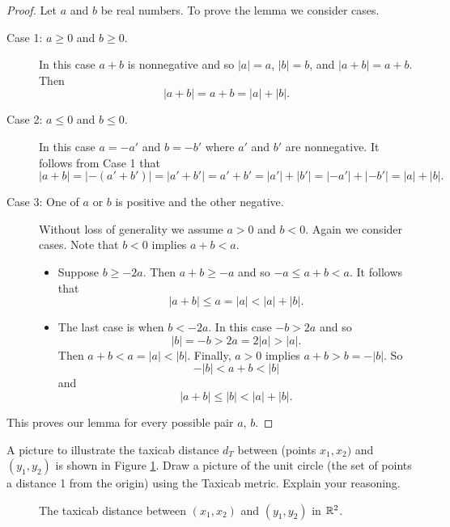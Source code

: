 \begin{pa}
\begin{proof} Let $a$ and $b$ be real numbers. To prove the lemma we consider cases. 
\begin{description}
\item[Case 1: $a \geq 0$ and $b \geq 0$.] In this case $a+b$ is nonnegative and so $| a | = a$, $| b | = b$, and $| a+b | = a+b$. Then
\[| a+b | = a+b =  | a | + | b |.\]
\item[Case 2: $a \leq 0$ and $b \leq 0$.] In this case $a = -a'$ and $b = -b'$ where $a'$ and $b'$ are nonnegative. It follows from Case 1 that 
\[| a+b | = | -(a'+b') | = | a'+b' | = a'+b' = | a' | + | b' | = | -a' | + | -b' | = | a | + | b |.\]
\item[Case 3: One of $a$ or $b$ is positive and the other negative.] Without loss of generality we assume $a > 0$ and $b < 0$. Again we consider cases. Note that $b < 0$ implies $a+b < a$. 
	\begin{itemize}
	\item Suppose $b \geq -2a$. Then $a+b \geq -a$ and so $-a \leq a+b < a$. It follows that  
\[| a+b | \leq a = | a | < | a | + | b |.\]  
	\item The last case is when $b < -2a$. In this case $-b > 2a$ and so 
	\[| b | = -b > 2a = 2| a | > | a |.\]
	 Then $a+b < a = | a | < | b |$. Finally, $a > 0$ implies $a+b > b = -| b |$. So
\[- | b | < a+b < | b |\]
and 
\[| a+b | \leq | b | < | a | + | b |.\]
	\end{itemize}
\end{description}
This proves our lemma for every possible pair $a$, $b$.
\end{proof}  

\item A picture to illustrate the taxicab distance $d_T$ between (points $x_1,x_2)$ and $(y_1,y_2)$ is shown in Figure \ref{F:PA_metric}. Draw a picture of the unit circle (the set of points a distance 1 from the origin) using the Taxicab metric. Explain your reasoning.
\begin{figure}[ht]
\begin{center}
\end{center}
\caption{The taxicab distance between $(x_1,x_2)$ and $(y_1,y_2)$ in $\mathbb{R}^2$.}
\label{F:PA_metric}
\end{figure}

	
\ee


\end{pa}

